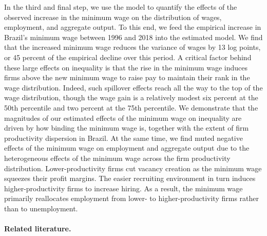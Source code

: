 In the third and final step, we use the model to quantify the effects of the observed increase in the minimum wage on the distribution of wages, employment, and aggregate output. To this end, we feed the empirical increase in Brazil's minimum wage between 1996 and 2018 into the estimated model. We find that the increased minimum wage reduces the variance of wages by 13 log points, or 45 percent of the empirical decline over this period. A critical factor behind these large effects on inequality is that the rise in the minimum wage induces firms above the new minimum wage to raise pay to maintain their rank in the wage distribution. Indeed, such spillover effects reach all the way to the top of the wage distribution, though the wage gain is a relatively modest six percent at the 50th percentile and two percent at the 75th percentile. We demonstrate that the magnitudes of our estimated effects of the minimum wage on inequality are driven by how binding the minimum wage is, together with the extent of firm productivity dispersion in Brazil. At the same time, we find muted negative effects of the minimum wage on employment and aggregate output due to the heterogeneous effects of the minimum wage across the firm productivity distribution. Lower-productivity firms cut vacancy creation as the minimum wage squeezes their profit margins. The easier recruiting environment in turn induces higher-productivity firms to increase hiring. As a result, the minimum wage primarily reallocates employment from lower- to higher-productivity firms rather than to unemployment.

\paragraph{Related literature.}

